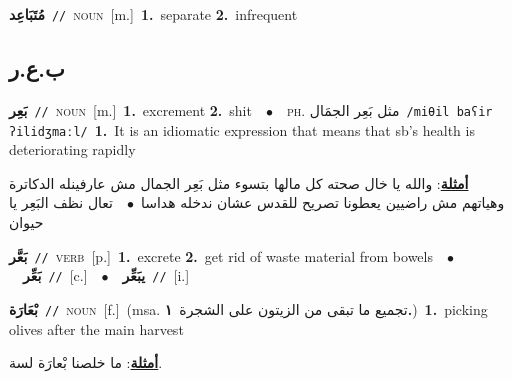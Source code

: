 \documentclass[10pt,a4paper,twoside]{article} %
\begin{document}
\begin{multicols}{2}
{\setlength\topsep{0pt}\textbf{\foreignlanguage{arabic}{مُتَبَاعِد}}\ {\color{gray}\texttt{//}\color{black}}\ \textsc{noun}\ [m.]\ \textbf{1.}~separate  \textbf{2.}~infrequent\ } \vspace{2mm}

\vspace{-3mm}
\subsection*{\color{blue}\foreignlanguage{arabic}{ب.ع.ر}\color{blue}{}} 

{\setlength\topsep{0pt}\textbf{\foreignlanguage{arabic}{بَعِر}}\ {\color{gray}\texttt{//}\color{black}}\ \textsc{noun}\ [m.]\ \textbf{1.}~excrement  \textbf{2.}~shit\ \ $\bullet$\ \ \textsc{ph.} \color{gray} \foreignlanguage{arabic}{مثل بَعِر الجمَال}\color{black}\ {\color{gray}\texttt{/{\sffamily miθil baʕir ʔilidʒmaːl}/}\color{black}}\ \textbf{1.}~It is an idiomatic expression that means that sb's health is deteriorating rapidly\  \begin{flushright}\color{gray}\foreignlanguage{arabic}{\textbf{\underline{\foreignlanguage{arabic}{أمثلة}}}: والله يا خال صحته كل مالها بتسوء مثل بَعِر الجمال مش عارفينله الدكاترة وهياتهم مش راضيين يعطونا تصريح للقدس عشان ندخله هداسا\ $\bullet$\ \  تعال نظف البَعِر يا حيوان}\end{flushright}\color{black}} \vspace{2mm}

{\setlength\topsep{0pt}\textbf{\foreignlanguage{arabic}{بَعَّر}}\ {\color{gray}\texttt{//}\color{black}}\ \textsc{verb}\ [p.]\ \textbf{1.}~excrete  \textbf{2.}~get rid of waste material from bowels\ \ $\bullet$\ \ \setlength\topsep{0pt}\textbf{\foreignlanguage{arabic}{بَعِّر}}\ {\color{gray}\texttt{//}\color{black}}\ [c.]\ \ $\bullet$\ \ \setlength\topsep{0pt}\textbf{\foreignlanguage{arabic}{يبَعِّر}}\ {\color{gray}\texttt{//}\color{black}}\ [i.]\ } \vspace{2mm}

{\setlength\topsep{0pt}\textbf{\foreignlanguage{arabic}{بْعَارَة}}\ {\color{gray}\texttt{//}\color{black}}\ \textsc{noun}\ [f.]\ \color{gray}(msa. \foreignlanguage{arabic}{تجميع ما تبقى من الزيتون على الشجرة}~\foreignlanguage{arabic}{\textbf{١.}})\color{black}\ \textbf{1.}~picking olives after the main harvest\  \begin{flushright}\color{gray}\foreignlanguage{arabic}{\textbf{\underline{\foreignlanguage{arabic}{أمثلة}}}: ما خلصنا بْعارَة لسة.}\end{flushright}\color{black}} \vspace{2mm}


\end{multicols}
\end{document}

